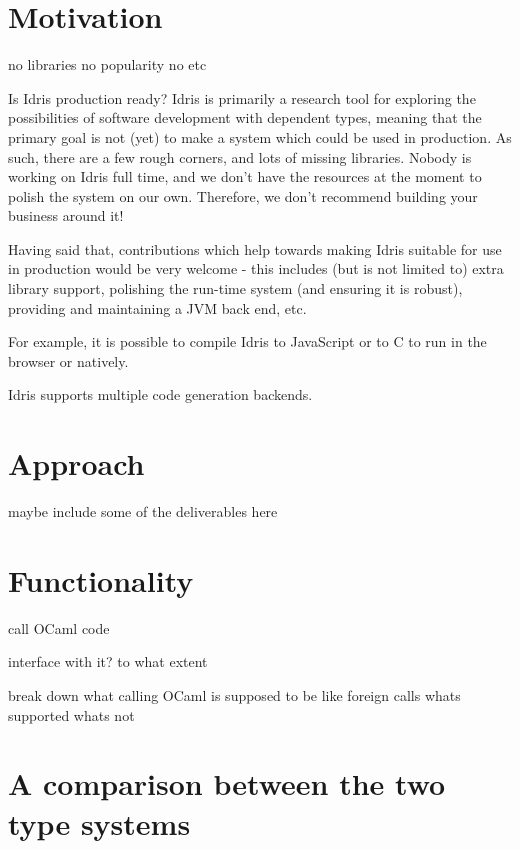 \section{Motivation}
no libraries no popularity no etc

Is Idris production ready?
Idris is primarily a research tool for exploring the possibilities of software development with dependent types, meaning that the primary goal is not (yet) to make a system which could be used in production. As such, there are a few rough corners, and lots of missing libraries. Nobody is working on Idris full time, and we don’t have the resources at the moment to polish the system on our own. Therefore, we don’t recommend building your business around it!

Having said that, contributions which help towards making Idris suitable for use in production would be very welcome - this includes (but is not limited to) extra library support, polishing the run-time system (and ensuring it is robust), providing and maintaining a JVM back end, etc.



For example, it is possible to compile Idris to JavaScript or to C
to run in the browser or natively. 

Idris supports multiple code generation backends.

\section{Approach}

maybe include some of the deliverables here

\section{Functionality}

call OCaml code

interface with it? to what extent

break down what calling OCaml is supposed to be like
foreign calls whats supported whats not

\section{A comparison between the two type systems}